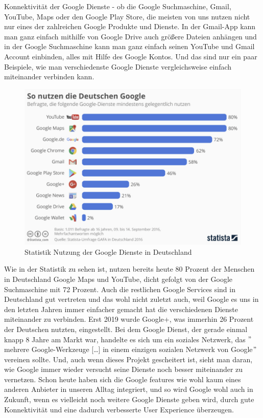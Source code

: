 Konnektivität der Google Dienste - ob die Google Suchmaschine, Gmail, YouTube, Maps oder den Google Play Store,
die meisten von uns nutzen nicht nur eines der zahlreichen Google Produkte und Dienste.
In der Gmail-App kann man ganz einfach mithilfe von Google Drive auch größere Dateien anhängen und in der Google Suchmaschine kann man ganz einfach seinen YouTube und Gmail Account einbinden, alles mit Hilfe des Google Kontos.
Und das sind nur ein paar Beispiele, wie man verschiedenste Google Dienste vergleichsweise einfach miteinander verbinden kann.
\begin{figure}[ht]
    \centering
    \includegraphics[width=120mm]{images/statistic_googleServices}
    \caption{Statistik Nutzung der Google Dienste in Deutschland}
    \label{fig:statisticGoogleServices}
\end{figure}  %
Wie in der Statistik zu sehen ist, nutzen bereits heute 80 Prozent der Menschen in Deutschland Google Maps und YouTube, dicht gefolgt von der Google Suchmaschine mit 72 Prozent.
Auch die restlichen Google Services sind in Deutschland gut vertreten und das wohl nicht zuletzt auch,
weil Google es uns in den letzten Jahren immer einfacher gemacht hat die verschiedenen Dienste miteinander zu verbinden.
Erst 2019 wurde Google+, was immerhin 26 Prozent der Deutschen nutzten, eingestellt.
Bei dem Google Dienst, der gerade einmal knapp 8 Jahre am Markt war, handelte es sich um ein soziales Netzwerk,
das \("\)mehrere Google-Werkzeuge [\ldots] in einem einzigen sozialen Netzwerk von Google\("\)\cite{JEC21} vereinen sollte.\cite{JEC21}
Und, auch wenn dieses Projekt gescheitert ist, sieht man daran, wie Google immer wieder versucht seine Dienste noch besser miteinander zu vernetzen.
Schon heute haben sich die Google features wie wohl kaum eines anderen Anbieter in unseren Alltag integriert,
und so wird Google wohl auch in Zukunft, wenn es vielleicht noch weitere Google Dienste geben wird, durch gute Konnektivität und eine dadurch verbesserte User Experience überzeugen.\\

